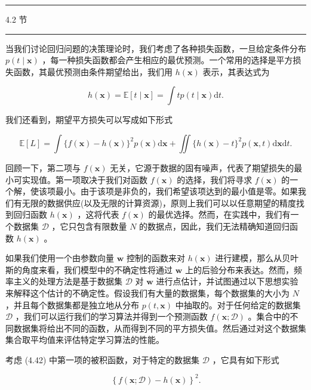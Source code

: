 \documentclass[10pt]{article}
\newcommand{\HRule}{\begin{center}\rule{0.9\linewidth}{0.2mm}\end{center}}
\begin{document}
\HRule

4.2 节

\HRule

当我们讨论回归问题的决策理论时，我们考虑了各种损失函数，一旦给定条件分布 \(p\left( {t \mid  \mathbf{x}}\right)\) ，每一种损失函数都会产生相应的最优预测。一个常用的选择是平方损失函数，其最优预测由条件期望给出，我们用 \(h\left( \mathbf{x}\right)\) 表示，其表达式为

\[
h\left( \mathbf{x}\right)  = \mathbb{E}\left\lbrack  {t \mid  \mathbf{x}}\right\rbrack   = \int {tp}\left( {t \mid  \mathbf{x}}\right) \mathrm{d}t. \tag{4.41}
\]

我们还看到，期望平方损失可以写成如下形式

\[
\mathbb{E}\left\lbrack  L\right\rbrack   = \int \{ f\left( \mathbf{x}\right)  - h\left( \mathbf{x}\right) {\} }^{2}p\left( \mathbf{x}\right) \mathrm{d}\mathbf{x} + \iint \{ h\left( \mathbf{x}\right)  - t{\} }^{2}p\left( {\mathbf{x},t}\right) \mathrm{d}\mathbf{x}\mathrm{d}t. \tag{4.42}
\]

回顾一下，第二项与 \(f\left( \mathbf{x}\right)\) 无关，它源于数据的固有噪声，代表了期望损失的最小可实现值。第一项取决于我们对函数 \(f\left( \mathbf{x}\right)\) 的选择，我们将寻求 \(f\left( \mathbf{x}\right)\) 的一个解，使该项最小。由于该项是非负的，我们希望该项达到的最小值是零。如果我们有无限的数据供应(以及无限的计算资源)，原则上我们可以以任意期望的精度找到回归函数 \(h\left( \mathbf{x}\right)\) ，这将代表 \(f\left( \mathbf{x}\right)\) 的最优选择。然而，在实践中，我们有一个数据集 \(\mathcal{D}\) ，它只包含有限数量 \(N\) 的数据点，因此，我们无法精确知道回归函数 \(h\left( \mathbf{x}\right)\) 。

如果我们使用一个由参数向量 \(\mathbf{w}\) 控制的函数来对 \(h\left( \mathbf{x}\right)\) 进行建模，那么从贝叶斯的角度来看，我们模型中的不确定性将通过 \(\mathbf{w}\) 上的后验分布来表达。然而，频率主义的处理方法是基于数据集 \(\mathcal{D}\) 对 \(\mathbf{w}\) 进行点估计，并试图通过以下思想实验来解释这个估计的不确定性。假设我们有大量的数据集，每个数据集的大小为 \(N\) ，并且每个数据集都是独立地从分布 \(p\left( {t,\mathbf{x}}\right)\) 中抽取的。对于任何给定的数据集 \(\mathcal{D}\) ，我们可以运行我们的学习算法并得到一个预测函数 \(f\left( {\mathbf{x};\mathcal{D}}\right)\) 。集合中的不同数据集将给出不同的函数，从而得到不同的平方损失值。然后通过对这个数据集集合取平均值来评估特定学习算法的性能。

考虑 (4.42) 中第一项的被积函数，对于特定的数据集 \(\mathcal{D}\) ，它具有如下形式

\[
{\left\{  f\left( \mathbf{x};\mathcal{D}\right)  - h\left( \mathbf{x}\right) \right\}  }^{2}. \tag{4.43}
\]
\end{document}
